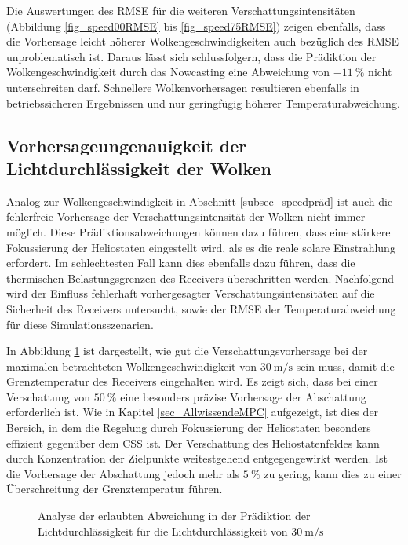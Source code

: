 Die Auswertungen des RMSE für die weiteren Verschattungsintensitäten (Abbildung \ref{fig_speed00RMSE} bis \ref{fig_speed75RMSE}) zeigen ebenfalls, dass die Vorhersage leicht höherer Wolkengeschwindigkeiten auch bezüglich des RMSE unproblematisch ist.
Daraus lässt sich schlussfolgern, dass die Prädiktion der Wolkengeschwindigkeit durch das Nowcasting eine Abweichung von $\SI{-11}{\percent}$ nicht unterschreiten darf.
Schnellere Wolkenvorhersagen resultieren ebenfalls in betriebssicheren Ergebnissen und nur geringfügig höherer Temperaturabweichung.


\subsection{Vorhersageungenauigkeit der Lichtdurchlässigkeit der Wolken} \label{subsec_shadingpräd}
Analog zur Wolkengeschwindigkeit in Abschnitt \ref{subsec_speedpräd} ist auch die fehlerfreie Vorhersage der Verschattungsintensität der Wolken nicht immer möglich.
Diese Prädiktionsabweichungen können dazu führen, dass eine stärkere Fokussierung der Heliostaten eingestellt wird, als es die reale solare Einstrahlung erfordert.
Im schlechtesten Fall kann dies ebenfalls dazu führen, dass die thermischen Belastungsgrenzen des Receivers überschritten werden.
Nachfolgend wird der Einfluss fehlerhaft vorhergesagter Verschattungsintensitäten auf die Sicherheit des Receivers untersucht, sowie der RMSE der Temperaturabweichung für diese Simulationsszenarien.

In Abbildung \ref{fig_shadingsafe} ist dargestellt, wie gut die Verschattungsvorhersage bei der maximalen betrachteten Wolkengeschwindigkeit von $\SI{30}{\metre\per\second}$ sein muss, damit die Grenztemperatur des Receivers eingehalten wird.
Es zeigt sich, dass bei einer Verschattung von $\SI{50}{\percent}$ eine besonders präzise Vorhersage der Abschattung erforderlich ist.
Wie in Kapitel \ref{sec_AllwissendeMPC} aufgezeigt, ist dies der Bereich, in dem die Regelung durch Fokussierung der Heliostaten besonders effizient gegenüber dem CSS ist.
Der Verschattung des Heliostatenfeldes kann durch Konzentration der Zielpunkte weitestgehend entgegengewirkt werden.
Ist die Vorhersage der Abschattung jedoch mehr als $\SI{5}{\percent}$ zu gering, kann dies zu einer Überschreitung der Grenztemperatur führen.

\begin{figure}[h!]
    \centering
    \setlength{\fboxsep}{1pt}
    \setlength{\fboxrule}{1pt}
    \caption[Analyse der erlaubten Abweichung in der Prädiktion der Lichtdurchlässigkeit für die Lichtdurchlässigkeit von $\SI{30}{\metre\per\second}$]{Analyse der erlaubten Abweichung in der Prädiktion der Lichtdurchlässigkeit für die Lichtdurchlässigkeit von $\SI{30}{\metre\per\second}$}
    \label{fig_shadingsafe}
\end{figure}

